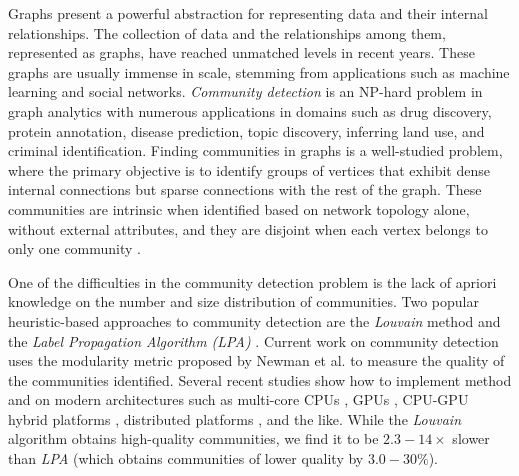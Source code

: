 Graphs present a powerful abstraction for representing data and their internal relationships. The collection of data and the relationships among them, represented as graphs, have reached unmatched levels in recent years. These graphs are usually immense in scale, stemming from applications such as machine learning and social networks. \textit{Community detection} is an NP-hard problem in graph analytics with numerous applications in domains such as drug discovery, protein annotation, disease prediction, topic discovery, inferring land use, and criminal identification. Finding communities in graphs is a well-studied problem, where the primary objective is to identify groups of vertices that exhibit dense internal connections but sparse connections with the rest of the graph. These communities are intrinsic when identified based on network topology alone, without external attributes, and they are disjoint when each vertex belongs to only one community \cite{com-gregory10}.

One of the difficulties in the community detection problem is the lack of apriori knowledge on the number and size distribution of communities. Two popular heuristic-based approaches to community detection are the \textit{Louvain} method \cite{com-blondel08} and the \textit{Label Propagation Algorithm (LPA)} \cite{com-raghavan07}. Current work on community detection uses the modularity metric proposed by Newman et al. \cite{com-newman06} to measure the quality of the communities identified. Several recent studies show how to implement \Lou{} method and \LPA{} on modern architectures such as multi-core CPUs \cite{com-fazlali17}, GPUs \cite{com-cheong13}, CPU-GPU hybrid platforms \cite{com-bhowmick22}, distributed platforms \cite{com-ghosh18}, and the like. While the \textit{Louvain} algorithm obtains high-quality communities, we find it to be $2.3 - 14\times$ slower than \textit{LPA} (which obtains communities of lower quality by $3.0 - 30\%$).

